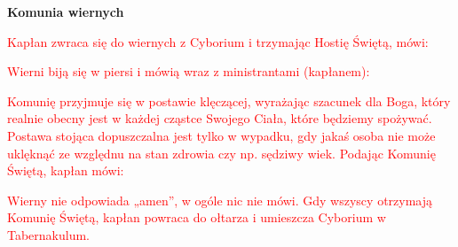 \begin{center}
\textbf{Komunia wiernych}
\end{center}

\begin{center}
\textcolor{red}{Kapłan zwraca się do wiernych z Cyborium i trzymając Hostię Świętą, mówi:}
\end{center}

\begin{Parallel}[v]{0.485\textwidth}{0.485\textwidth}

\end{Parallel}

\begin{center}
\textcolor{red}{Wierni biją się w piersi i mówią wraz z ministrantami (kapłanem):}
\end{center}

\begin{Parallel}[v]{0.485\textwidth}{0.485\textwidth}

\end{Parallel}

\begin{center}
\textcolor{red}{Komunię przyjmuje się w postawie klęczącej, wyrażając szacunek dla Boga, który realnie obecny jest w każdej cząstce Swojego Ciała, które będziemy spożywać. Postawa stojąca dopuszczalna jest tylko w wypadku, gdy jakaś osoba nie może uklęknąć ze względnu na stan zdrowia czy np. sędziwy wiek. Podając Komunię Świętą, kapłan mówi:}
\end{center}

\begin{Parallel}[v]{0.485\textwidth}{0.485\textwidth}

\end{Parallel}

\begin{center}
\textcolor{red}{Wierny nie odpowiada „amen”, w ogóle nic nie mówi. Gdy wszyscy otrzymają Komunię Świętą, kapłan powraca do ołtarza i umieszcza Cyborium w Tabernakulum.}
\end{center}

